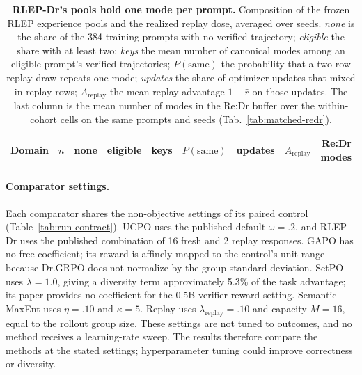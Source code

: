 \begin{table}[H]
  \centering
  \caption{\textbf{RLEP-Dr's pools hold one mode per prompt.} Composition of
  the frozen RLEP experience pools and the realized replay dose, averaged over
  seeds. \emph{none} is the share of the 384 training prompts with no verified
  trajectory; \emph{eligible} the share with at least two; \emph{keys} the mean
  number of canonical modes among an eligible prompt's verified trajectories;
  $P(\text{same})$ the probability that a two-row replay draw repeats one
  mode; \emph{updates} the share of optimizer updates that mixed in replay
  rows; $A_{\text{replay}}$ the mean replay advantage $1-\bar r$ on those
  updates. The last column is the mean number of modes in the Re:Dr buffer
  over the within-cohort cells on the same prompts and seeds
  (Tab.~\ref{tab:matched-redr}).}
  \label{tab:rlep-pool-composition}
  \small
  \setlength{\tabcolsep}{5pt}
  \begin{tabular}{@{}lrrrrrrrr@{}}
    \toprule
    \textbf{Domain} & $n$ & \textbf{none} & \textbf{eligible} & \textbf{keys}
      & $P(\text{same})$ & \textbf{updates} & $A_{\text{replay}}$
      & \textbf{Re:Dr modes} \\
    \midrule
    
  \end{tabular}
\end{table}

\paragraph{Comparator settings.}
\label{app:comparator-settings}
Each comparator shares the non-objective settings of its paired control
(Table~\ref{tab:run-contract}). UCPO uses the published default
$\omega=.2$, and RLEP-Dr uses the published combination of 16 fresh and
2 replay responses. GAPO has no free coefficient; its reward is affinely
mapped to the control's unit range because Dr.GRPO does not normalize by
the group standard deviation. SetPO uses $\lambda=1.0$, giving a diversity
term approximately 5.3\% of the task advantage; its paper provides no
coefficient for the 0.5B verifier-reward setting. Semantic-MaxEnt uses
$\eta=.10$ and $\kappa=5$. Replay uses $\lambda_{\mathrm{replay}}=.10$
and capacity $M=16$, equal to the rollout group size. These settings are
not tuned to \mb{} outcomes, and no method receives a learning-rate sweep.
The results therefore compare the methods at the stated settings;
hyperparameter tuning could improve correctness or diversity.

